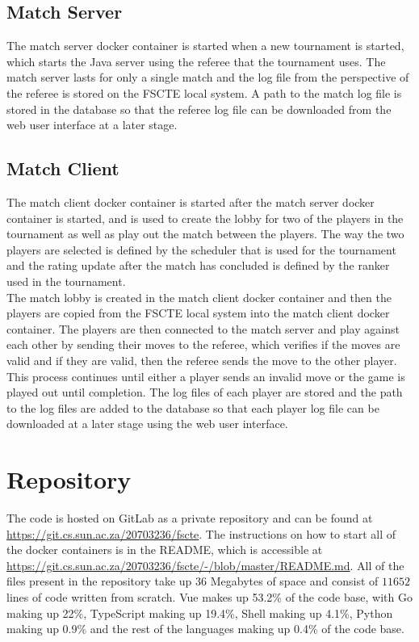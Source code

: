 \documentclass[a4paper, 11pt]{report}
\begin{document}
\subsection{Match Server}

The match server docker container is started when a new tournament is started,
which starts the Java server using the referee that the tournament uses. The match
server lasts for only a single match and the log file from the perspective of the
referee is stored on the FSCTE local system. A path to the match log file is stored
in the database so that the referee log file can be downloaded from the web user
interface at a later stage.

\subsection{Match Client}

The match client docker container is started after the match server docker container
is started, and is used to create the lobby for two of the players in the tournament
as well as play out the match between the players. The way the two players are
selected is defined by the scheduler that is used for the tournament and the
rating update after the match has concluded is defined by the ranker used in the
tournament. \\

The match lobby is created in the match client docker container and then the
players are copied from the FSCTE local system into the match client docker
container. The players are then connected to the match server and play against
each other by sending their moves to the referee, which verifies if the moves are
valid and if they are valid, then the referee sends the move to the other player.
This process continues until either a player sends an invalid move or the game
is played out until completion. The log files of each player are stored and the
path to the log files are added to the database so that each player log file can
be downloaded at a later stage using the web user interface.

\section{Repository}

The code is hosted on GitLab as a private repository and can be found at
\url{https://git.cs.sun.ac.za/20703236/fscte}. The instructions on how to start
all of the docker containers is in the README, which is accessible at
\url{https://git.cs.sun.ac.za/20703236/fscte/-/blob/master/README.md}. All of
the files present in the repository take up 36 Megabytes of space and consist
of $11 652$ lines of code written from scratch. Vue makes up 53.2\% of the code
base, with Go making up 22\%, TypeScript making up 19.4\%, Shell making up 4.1\%,
Python making up 0.9\% and the rest of the languages making up 0.4\% of the code
base.
\end{document}
